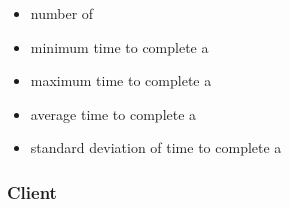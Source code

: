 \begin{itemize}
        \begin{itemize} 
            \item{number of \varWorkItems}
            \item{minimum time to complete a \varWorkItem}
            \item{maximum time to complete a \varWorkItem}
            \item{average time to complete a \varWorkItem}
            \item{standard deviation of time to complete a \varWorkItem}
        \end{itemize}
    
    \end{itemize}
    
    \subsubsection{Client}
    
